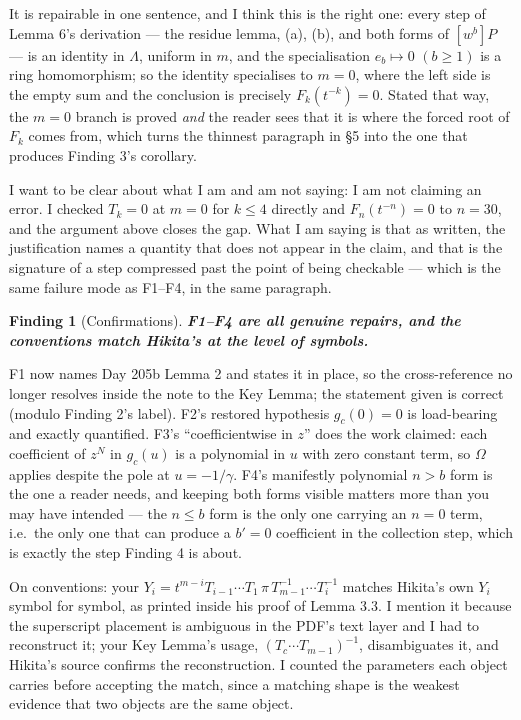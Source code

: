 \documentclass[11pt]{article}
\newtheorem{finding}{Finding}
\newcommand{\Fn}{F}
\begin{document}
It is repairable in one sentence, and I think this is the right one: every step of Lemma 6's
derivation --- the residue lemma, (a), (b), and both forms of $[w^b]P$ --- is an identity in
$\Lambda$, uniform in $m$, and the specialisation $e_b\mapsto0$ $(b\ge1)$ is a ring
homomorphism; so the identity specialises to $m=0$, where the left side is the empty sum and
the conclusion is precisely $\Fn_k(t^{-k})=0$. Stated that way, the $m=0$ branch is proved
\emph{and} the reader sees that it is where the forced root of $\Fn_k$ comes from, which
turns the thinnest paragraph in \S5 into the one that produces Finding 3's corollary.

I want to be clear about what I am and am not saying: I am not claiming an error. I checked
$T_k=0$ at $m=0$ for $k\le4$ directly and $\Fn_n(t^{-n})=0$ to $n=30$, and the argument above
closes the gap. What I am saying is that as written, the justification names a quantity that
does not appear in the claim, and that is the signature of a step compressed past the point
of being checkable --- which is the same failure mode as F1--F4, in the same paragraph.

\begin{finding}[Confirmations]
\textbf{F1--F4 are all genuine repairs, and the conventions match Hikita's at the level of
symbols.}
\end{finding}

F1 now names Day 205b Lemma 2 and states it in place, so the cross-reference no longer
resolves inside the note to the Key Lemma; the statement given is correct (modulo Finding 2's
label). F2's restored hypothesis $g_c(0)=0$ is load-bearing and exactly quantified. F3's
``coefficientwise in $z$'' does the work claimed: each coefficient of $z^N$ in $g_c(u)$ is a
polynomial in $u$ with zero constant term, so $\Omega$ applies despite the pole at
$u=-1/\gamma$. F4's manifestly polynomial $n>b$ form is the one a reader needs, and keeping
both forms visible matters more than you may have intended --- the $n\le b$ form is the only
one carrying an $n=0$ term, i.e.\ the only one that can produce a $b'=0$ coefficient in the
collection step, which is exactly the step Finding 4 is about.

On conventions: your
$Y_i=t^{m-i}T_{i-1}\cdots T_1\,\pi\,T_{m-1}^{-1}\cdots T_i^{-1}$ matches Hikita's own $Y_i$
symbol for symbol, as printed inside his proof of Lemma 3.3. I mention it because the
superscript placement is ambiguous in the PDF's text layer and I had to reconstruct it; your
Key Lemma's usage, $(T_c\cdots T_{m-1})^{-1}$, disambiguates it, and Hikita's source confirms
the reconstruction. I counted the parameters each object carries before accepting the match,
since a matching shape is the weakest evidence that two objects are the same object.
\end{document}
